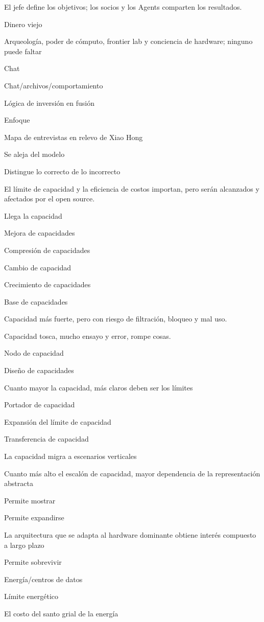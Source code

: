 \documentclass{article}
\begin{document}
El jefe define los objetivos; los socios y los Agents comparten los resultados.

Dinero viejo

Arqueología, poder de cómputo, frontier lab y conciencia de hardware; ninguno puede faltar

Chat

Chat/archivos/comportamiento

Lógica de inversión en fusión

Enfoque

Mapa de entrevistas en relevo de Xiao Hong

Se aleja del modelo

Distingue lo correcto de lo incorrecto

El límite de capacidad y la eficiencia de costos importan, pero serán alcanzados y afectados por el open source.

Llega la capacidad

Mejora de capacidades

Compresión de capacidades

Cambio de capacidad

Crecimiento de capacidades

Base de capacidades

Capacidad más fuerte, pero con riesgo de filtración, bloqueo y mal uso.

Capacidad tosca, mucho ensayo y error, rompe cosas.

Nodo de capacidad

Diseño de capacidades

Cuanto mayor la capacidad, más claros deben ser los límites

Portador de capacidad

Expansión del límite de capacidad

Transferencia de capacidad

La capacidad migra a escenarios verticales

Cuanto más alto el escalón de capacidad, mayor dependencia de la representación abstracta

Permite mostrar

Permite expandirse

La arquitectura que se adapta al hardware dominante obtiene interés compuesto a largo plazo

Permite sobrevivir

Energía/centros de datos

Límite energético

El costo del santo grial de la energía
\end{document}
